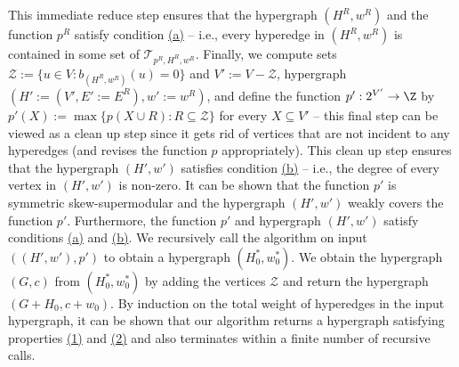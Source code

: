 \documentclass{article}
\newcommand{\zeros}{\ensuremath{\mathcal{Z}}\xspace}
\begin{document}
This immediate reduce step ensures that the hypergraph $(H^R, w^R)$ and the function $p^R$ satisfy condition \hyperlink{WeakToStrong(a)}{(a)} -- i.e., every hyperedge in $(H^R, w^R)$ is contained in some set of $\mathcal{T}_{p^R, H^R, w^R}$. 
Finally, we compute sets $\zeros:=\{u\in V: b_{(H^R, w^R)}(u)=0\}$ and $V':=V-\zeros$, hypergraph $(H':=(V', E':=E^R), w':=w^R)$, and define the function $p':2^{V'}\rightarrow \Z$ by $p'(X):=\max\{p(X\cup R): R\subseteq \zeros\}$ for every $X\subseteq V'$ -- this final step can be viewed as a clean up step since it gets rid of vertices that are not incident to any hyperedges (and revises the function $p$ appropriately). 
This clean up step ensures that the hypergraph $(H', w')$ satisfies condition \hyperlink{WeakToStrong(b)}{(b)} -- i.e., the degree of every vertex in $(H', w')$ is non-zero. 
It can be shown that the function $p'$ is symmetric skew-supermodular and the hypergraph $(H', w')$ weakly covers the function $p'$. Furthermore, the function $p'$ and hypergraph $(H', w')$ satisfy conditions \hyperlink{WeakToStrong(a)}{(a)} and \hyperlink{WeakToStrong(b)}{(b)}. 
We recursively call the algorithm on input $((H', w'), p')$ to obtain a hypergraph $(H_0^*, w_0^*)$. We obtain the hypergraph $(G, c)$ from $(H_0^*, w_0^*)$ by adding the vertices $\zeros$ and return the hypergraph $(G+H_0, c+w_0)$.  
By induction on the total weight of hyperedges in the input hypergraph, it can be shown that our algorithm returns a hypergraph satisfying properties \hyperlink{WeakToStrong(1)}{(1)} and \hyperlink{WeakToStrong(2)}{(2)} and also terminates within a finite number of recursive calls. 
\end{document}
